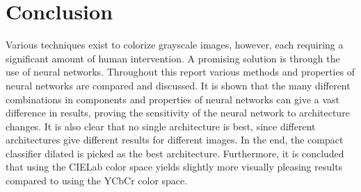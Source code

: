 \section{Conclusion}

Various techniques exist to colorize grayscale images, however, each requiring a significant amount of human intervention. A promising solution is through the use of neural networks. Throughout this report various methods and properties of neural networks are compared and discussed. It is shown that the many different combinations in components and properties of neural networks can give a vast difference in results, proving the sensitivity of the neural network to architecture changes. It is also clear that no single architecture is best, since different architectures give different results for different images. In the end, the compact classifier dilated is picked as the best architecture. Furthermore, it is concluded that using the CIELab color space yields slightly more visually pleasing results compared to using the YCbCr color space. 


